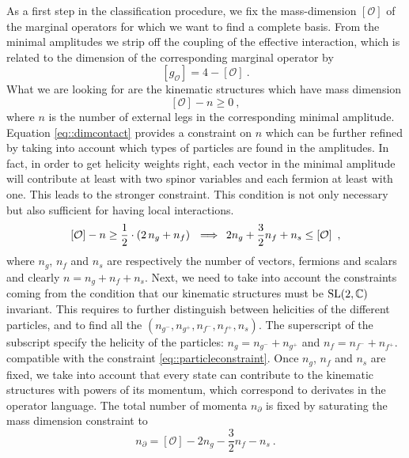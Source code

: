 \documentclass[aps,prd,nofootinbib,twocolumn,10pt]{revtex4-2}
\begin{document}
As a first step in the classification procedure, we fix the mass-dimension $\left[\mathcal{O}\right]$ of the marginal operators for which we want to find a complete basis. From the minimal amplitudes we strip off the coupling of the effective interaction, which is related to the dimension of the corresponding marginal operator by
\begin{equation}
    \left[g_{\mathcal{O}}\right] = 4-\left[\mathcal{O}\right]\ .
\end{equation}
What we are looking for are the kinematic structures which have mass dimension
\begin{equation}
\label{eq::dimcontact}
    \left[\mathcal{O}\right]-n\geq 0\ ,
\end{equation}
where $n$ is the number of external legs in the corresponding minimal amplitude. Equation \eqref{eq::dimcontact} provides a constraint on $n$ which can be further refined by taking into account which types of particles are found in the amplitudes. In fact, in order to get helicity weights right, each vector in the minimal amplitude will contribute at least with two spinor variables and each fermion at least with one. This leads to the stronger constraint. This condition is not only necessary but also sufficient for having local interactions.
\begin{equation}
\label{eq::particleconstraint}
 \left[\mathcal{O}\right] - n \geq \frac{1}{2} \cdot \left( 2\, n_g + n_f \right) \, \hspace{0.2em} \implies \hspace{0.2em} 2 n_g + \frac{3}{2} n_f + n_s \leq \left[\mathcal{O}\right]\ ,
\end{equation}
where $n_g$, $n_f$ and $n_s$ are respectively the number of vectors, fermions and scalars and clearly $n=n_g+n_f+n_s$.
Next, we need to take into account the constraints coming from the condition that our kinematic structures must be ${\rm SL}(2,\mathbb{C})$ invariant. This requires to further distinguish between helicities of the different particles, and to find all the $(n_{g^-},n_{g^+},n_{f^-},n_{f^+},n_s)$. The superscript of the subscript specify the helicity of the particles: $n_g = n_{g^-}+n_{g^+}$ and  $n_f = n_{f^-}+n_{f^+}$. compatible with the constraint \eqref{eq::particleconstraint}.
Once $n_g$, $n_f$ and $n_s$ are fixed, we take into account that every state can contribute to the kinematic structures with powers of its momentum, which correspond to derivates in the operator language. The total number of momenta $n_\partial$ is fixed by saturating the mass dimension constraint to
\begin{equation}
    n_\partial = \left[ \mathcal{O}\right] - 2 n_g - \frac{3}{2}n_f - n_s \> .
\end{equation}
\end{document}
